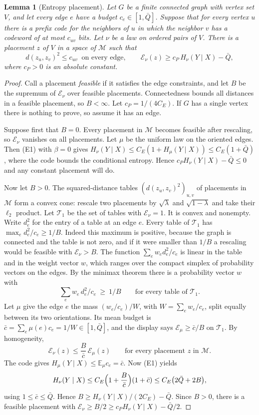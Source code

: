 \documentclass[11pt]{article}
\newtheorem{lemma}[theorem]{Lemma}
\theoremstyle{remark}
\newcommand{\E}{\mathbb E}
\newcommand{\cM}{\mathcal M}
\newcommand{\cE}{\mathcal E}
\begin{document}
\begin{lemma}[Entropy placement]\label{lem:placement}
Let \(G\) be a finite connected graph with vertex set \(V\), and let
every edge \(e\) have a \emph{budget} \(c_e\in[1,\bar Q]\). Suppose that
for every vertex \(u\) there is a prefix code for the neighbors of \(u\)
in which the neighbor \(v\) has a codeword of at most \(c_{uv}\) bits.
Let \(\nu\) be a law on ordered pairs of \(V\). There is a placement
\(z\) of \(V\) in a space of \(\cM\) such that
\[
 d(z_u,z_v)^2\le c_{uv}\ \text{ on every edge},\qquad
 \cE_\nu(z)\ge c_P\,H_\nu(Y\mid X)-\bar Q ,
\]
where \(c_P>0\) is an absolute constant.
\end{lemma}

\begin{proof}
Call a placement \emph{feasible} if it satisfies the edge constraints,
and let \(B\) be the supremum of \(\cE_\nu\) over feasible placements.
Connectedness bounds all distances in a feasible placement, so
\(B<\infty\). Let \(c_P=1/(4C_E)\). If \(G\) has a single vertex there is
nothing to prove, so assume it has an edge.

Suppose first that \(B=0\). Every placement in \(\cM\) becomes feasible
after rescaling, so \(\cE_\nu\) vanishes on all placements. Let \(\mu\)
be the uniform law on the oriented edges. Then (E1) with \(\beta=0\)
gives \(H_\nu(Y\mid X)\le C_E(1+H_\mu(Y\mid X))\le C_E(1+\bar Q)\), where
the code bounds the conditional entropy. Hence
\(c_PH_\nu(Y\mid X)-\bar Q\le0\) and any constant placement will do.

Now let \(B>0\). The squared-distance tables \((d(z_u,z_v)^2)_{u,v}\) of
placements in \(\cM\) form a convex cone: rescale two placements by
\(\sqrt\lambda\) and \(\sqrt{1-\lambda}\) and take their \(\ell_2\)
product. Let \(\mathcal T_1\) be the set of tables with \(\cE_\nu=1\). It
is convex and nonempty. Write \(d_e^2\) for the entry of a table at an
edge \(e\). Every table of \(\mathcal T_1\) has
\(\max_ed_e^2/c_e\ge1/B\). Indeed this maximum is positive, because the
graph is connected and the table is not zero, and if it were smaller
than \(1/B\) a rescaling would be feasible with \(\cE_\nu>B\). The
function \(\sum_ew_ed_e^2/c_e\) is linear in the table
and in the weight vector \(w\), which ranges over the compact simplex of
probability vectors on the edges. By the minimax theorem \cite{sion}
there is a probability vector \(w\) with
\[
 \sum_ew_e\,d_e^2/c_e\ \ge\ 1/B\qquad\text{for every table of }\mathcal T_1 .
\]
Let \(\mu\) give the edge \(e\) the mass \((w_e/c_e)/W\), with
\(W=\sum_ew_e/c_e\), split equally between its two orientations. Its mean
budget is \(\bar c=\sum_e\mu(e)c_e=1/W\in[1,\bar Q]\), and the display
says \(\cE_\mu\ge\bar c/B\) on \(\mathcal T_1\). By homogeneity,
\[
 \cE_\nu(z)\le\frac{B}{\bar c}\,\cE_\mu(z)
 \qquad\text{for every placement }z\text{ in }\cM .
\]
The code gives \(H_\mu(Y\mid X)\le\E_\mu c_e=\bar c\). Now (E1) yields
\[
 H_\nu(Y\mid X)\le C_E\Bigl(1+\frac B{\bar c}\Bigr)(1+\bar c)
   \le C_E\bigl(2\bar Q+2B\bigr),
\]
using \(1\le\bar c\le\bar Q\). Hence
\(B\ge H_\nu(Y\mid X)/(2C_E)-\bar Q\). Since \(B>0\), there is a feasible
placement with \(\cE_\nu\ge B/2\ge c_PH_\nu(Y\mid X)-\bar Q/2\).
\end{proof}
\end{document}

